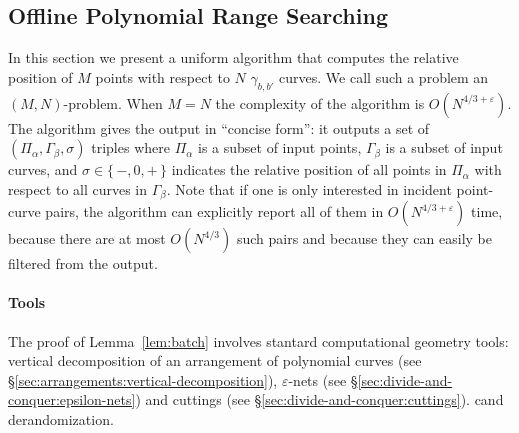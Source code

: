 \subsection{Offline Polynomial Range Searching}%
\label{sec:algo:point-curves-location}

In this section we present a uniform algorithm that computes the relative
position of \(M\) points with respect to \(N\) $\gamma_{b,b'}$ curves. We call
such a problem an \((M,N)\)-problem. When \(M=N\) the complexity of the
algorithm is \(O(N^{4/3+\varepsilon})\).
The algorithm gives the output in ``concise form'':
it outputs a set of $(\Pi_\alpha, \Gamma_\beta, \sigma)$ triples where
$\Pi_\alpha$ is a subset of input points, $\Gamma_\beta$ is a subset of input curves, and $\sigma \in
\{\,-,0,+\,\}$ indicates the relative position of all points in $\Pi_\alpha$ with
respect to all curves in $\Gamma_\beta$.
Note that if one is only interested in incident point-curve pairs, the
algorithm can explicitly report all of them in
$O(N^{4/3+\varepsilon})$ time, because there are at most $O(N^{4/3})$
such pairs and because they can easily be filtered from the output.

\paragraph{Tools} The proof of Lemma~\ref{lem:batch} involves stantard
computational geometry tools: vertical decomposition of an
arrangement of polynomial curves (see
\S\ref{sec:arrangements:vertical-decomposition}),
$\varepsilon$-nets (see \S\ref{sec:divide-and-conquer:epsilon-nets})
and cuttings (see \S\ref{sec:divide-and-conquer:cuttings}).
cand derandomization.

